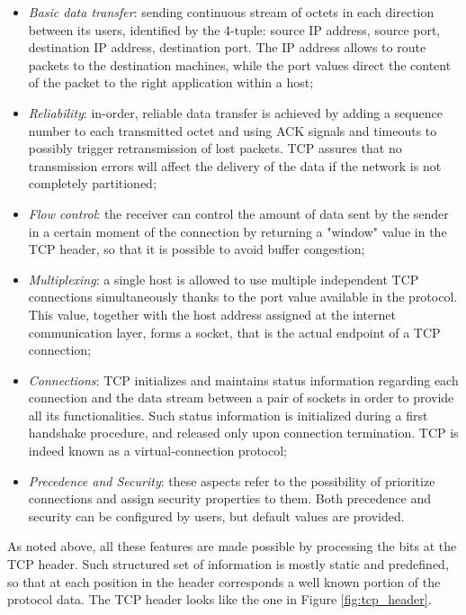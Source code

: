 \begin{itemize}
  \item \textit{Basic data transfer}: sending continuous stream of octets in each direction between its users, identified by the 4-tuple: source IP address, source port, destination IP address, destination port. The IP address allows to route packets to the destination machines, while the port values direct the content of the packet to the right application within a host;
  \item \textit{Reliability}: in-order, reliable data transfer is achieved by adding a sequence number to each transmitted octet and using ACK signals and timeouts to possibly trigger retransmission of lost packets. TCP assures that no transmission errors will affect the delivery of the data if the network is not completely partitioned;
  \item \textit{Flow control}: the receiver can control the amount of data sent by the sender in a certain moment of the connection by returning a "window" value in the TCP header, so that it is possible to avoid buffer congestion;
  \item \textit{Multiplexing}: a single host is allowed to use multiple independent TCP connections simultaneously thanks to the port value available in the protocol. This value, together with the host address assigned at the internet communication layer, forms a socket, that is the actual endpoint of a TCP connection;
  \item \textit{Connections}: TCP initializes and maintains status information regarding each connection and the data stream between a pair of sockets in order to provide all its functionalities. Such status information is initialized during a first handshake procedure, and released only upon connection termination. TCP is indeed known as a virtual-connection protocol;
  \item \textit{Precedence and Security}: these aspects refer to the possibility of prioritize connections and assign security properties to them. Both precedence and security can be configured by users, but default values are provided.
\end{itemize}

As noted above, all these features are made possible by processing the bits at the TCP header. Such structured set of information is mostly static and predefined, so that at each position in the header corresponds a well known portion of the protocol data. The TCP header looks like the one in Figure \ref{fig:tcp_header}.

